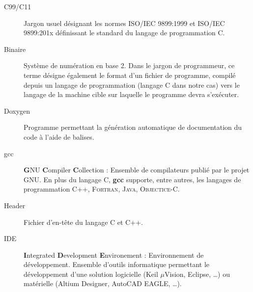\begin{description}
\item[C99/C11] Jargon usuel désignant les normes ISO/IEC 9899:1999 et ISO/IEC 9899:201x définissant le standard du langage de programmation C.
\item[Binaire] Système de numération en base 2.\linebreak
Dans le jargon de programmeur, ce terme désigne également le format d’un fichier de programme, compilé depuis un langage de programmation (langage C dans notre cas) vers le langage de la machine cible sur laquelle le programme devra s’exécuter.
\item[Doxygen] Programme permettant la génération automatique de documentation du code à l’aide de balises.
\item[gcc] \textbf{G}NU \textbf{C}ompiler \textbf{C}ollection : Ensemble de compilateurs publié par le projet GNU. En plus du langage C, \textbf{gcc} supporte, entre autres, les langages de programmation C++, \textsc{Fortran}, \textsc{Java}, \textsc{Objectice-C}.
\item[Header] Fichier d’en-tête du langage C et C++.
\item[IDE] \textbf{I}ntegrated \textbf{D}evelopment \textbf{E}nvironement : Environnement de développement.\linebreak
Ensemble d’outils informatique permettant le développement d’une solution logicielle (Keil $\mu$Vision, Eclipse, …) ou matérielle (Altium Designer, AutoCAD EAGLE, …).
\end{description}
\pagebreak
